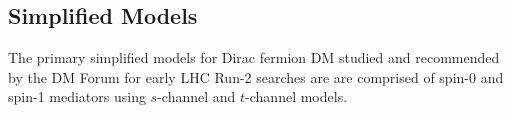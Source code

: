 







\subsection{Simplified Models}


The primary simplified models for Dirac fermion DM studied and recommended by the DM Forum for early LHC Run-2 searches are are comprised of spin-0 and spin-1 mediators using $s$-channel and $t$-channel models.

